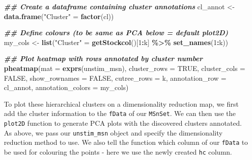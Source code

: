 \documentclass[9pt,a4paper,]{extarticle}
\newenvironment{Shaded}{\begin{snugshade}}{\end{snugshade}}
\newcommand{\AttributeTok}[1]{\textcolor[rgb]{0.13,0.29,0.53}{#1}}
\newcommand{\ConstantTok}[1]{\textcolor[rgb]{0.56,0.35,0.01}{#1}}
\newcommand{\DecValTok}[1]{\textcolor[rgb]{0.00,0.00,0.81}{#1}}
\newcommand{\DocumentationTok}[1]{\textcolor[rgb]{0.56,0.35,0.01}{\textbf{\textit{#1}}}}
\newcommand{\FloatTok}[1]{\textcolor[rgb]{0.00,0.00,0.81}{#1}}
\newcommand{\FunctionTok}[1]{\textcolor[rgb]{0.13,0.29,0.53}{\textbf{#1}}}
\newcommand{\NormalTok}[1]{#1}
\newcommand{\OtherTok}[1]{\textcolor[rgb]{0.56,0.35,0.01}{#1}}
\newcommand{\SpecialCharTok}[1]{\textcolor[rgb]{0.81,0.36,0.00}{\textbf{#1}}}
\newcommand{\StringTok}[1]{\textcolor[rgb]{0.31,0.60,0.02}{#1}}
\begin{document}
\begin{Shaded}
\begin{Highlighting}[]
\DocumentationTok{\#\# Create a dataframe containing cluster annotations}
\NormalTok{cl\_annot }\OtherTok{\textless{}{-}} \FunctionTok{data.frame}\NormalTok{(}\StringTok{"Cluster"} \OtherTok{=} \FunctionTok{factor}\NormalTok{(cl))}

\DocumentationTok{\#\# Define colours (to be same as PCA below = default plot2D)}
\NormalTok{my\_cols }\OtherTok{\textless{}{-}} \FunctionTok{list}\NormalTok{(}\StringTok{"Cluster"} \OtherTok{=} \FunctionTok{getStockcol}\NormalTok{()[}\DecValTok{1}\SpecialCharTok{:}\NormalTok{k] }\SpecialCharTok{\%\textgreater{}\%} \FunctionTok{set\_names}\NormalTok{(}\DecValTok{1}\SpecialCharTok{:}\NormalTok{k))}

\DocumentationTok{\#\# Plot heatmap with rows annotated by cluster number}
\FunctionTok{pheatmap}\NormalTok{(}\AttributeTok{mat =} \FunctionTok{exprs}\NormalTok{(unstim\_msn), }
         \AttributeTok{cluster\_rows =} \ConstantTok{TRUE}\NormalTok{,}
         \AttributeTok{cluster\_cols =} \ConstantTok{FALSE}\NormalTok{,}
         \AttributeTok{show\_rownames =} \ConstantTok{FALSE}\NormalTok{,}
         \AttributeTok{cutree\_rows =}\NormalTok{ k, }
         \AttributeTok{annotation\_row =}\NormalTok{ cl\_annot,}
         \AttributeTok{annotation\_colors =}\NormalTok{ my\_cols)}
\end{Highlighting}
\end{Shaded}

To plot these hierarchical clusters on a dimensionality reduction map, we first
add the cluster information to the \texttt{fData} of our \texttt{MSnSet}. We can then use the
\texttt{plot2D} function to generate PCA plots with the discovered clusters annotated.
As above, we pass our \texttt{unstim\_msn} object and specify the dimensionality reduction
method to use. We also tell the function which column of our \texttt{fData} to be used
for colouring the points - here we use the newly created \texttt{hc} column.

\begin{Shaded}
\end{Shaded}
\end{document}
